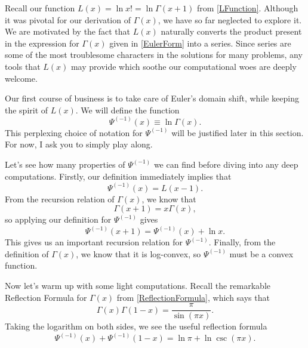 Recall our function $L(x) = \ln x! = \ln \Gamma(x+1)$ from \eqref{LFunction}.
Although it was pivotal for our derivation of $\Gamma(x)$, we have so far neglected to explore it.
We are motivated by the fact that $L(x)$ naturally converts the product present in the expression for $\Gamma(x)$ given in \eqref{EulerForm} into a series.
Since series are some of the most troublesome characters in the solutions for many problems, any tools that $L(x)$ may provide which soothe our computational woes are deeply welcome.

Our first course of business is to take care of Euler's domain shift, while keeping the spirit of $L(x)$.
We will define the function
\begin{equation}\label{digammaAntiderivative}
\Psi^{(-1)} (x) \equiv \ln \Gamma(x).
\end{equation}
This perplexing choice of notation for $\Psi^{(-1)}$ will be justified later in this section.
For now, I ask you to simply play along.

Let's see how many properties of $\Psi^{(-1)}$ we can find before diving into any deep computations.
Firstly, our definition immediately implies that
$$\Psi^{(-1)}(x) = L(x-1).$$
From the recursion relation of $\Gamma(x)$, we know that
$$\Gamma(x+1) = x\Gamma(x),$$
so applying our definition for $\Psi^{(-1)}$ gives
\begin{equation}\label{digammaAntiderivativeRecursionFormula}
\Psi^{(-1)} (x+1) = \Psi^{(-1)} (x) + \ln x.
\end{equation}
This gives us an important recursion relation for $\Psi^{(-1)}$.
Finally, from the definition of $\Gamma(x)$, we know that it is log-convex, so $\Psi^{(-1)}$ must be a convex function.

Now let's warm up with some light computations.
Recall the remarkable Reflection Formula for $\Gamma(x)$ from \eqref{ReflectionFormula}, which says that
$$\Gamma(x)\Gamma(1-x) = \frac{\pi}{\sin (\pi x)}.$$
Taking the logarithm on both sides, we see the useful reflection formula
\begin{equation}\label{digammaAntiderivativeReflectionFormula}
\Psi^{(-1)}(x) + \Psi^{(-1)}(1-x) = \ln \pi + \ln \csc (\pi x).
\end{equation}

